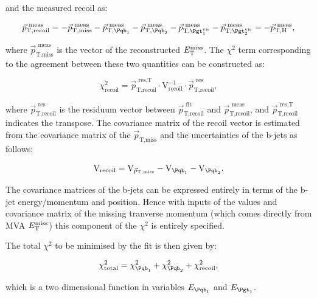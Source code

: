 and the measured recoil as:

\begin{equation}
\vec{p}_{\text{T},\text{recoil}}^{\text{~meas}} = -
\vec{p}_{\text{T},\text{miss}}^{\text{~meas}} -
\vec{p}_{\text{T},\Pqb_{1}}^{\text{~meas}} - \vec{p}_{\text{T},\Pqb_{2}}^{\text{~meas}} -
\vec{p}_{\text{T},\Pgt_{1}^{\text{vis}}}^{\text{~meas}} -
\vec{p}_{\text{T},\Pgt_{2}^{\text{vis}}}^{\text{~meas}} = -
\vec{p}_{\text{T},\text{H}}^{\text{~meas}} ,
\end{equation}

where $\vec{p}_{\text{T},\text{miss}}^{\text{~meas}}$ is the vector of the
reconstructed $E_{\mathrm{T}}^{\text{miss}}$. The $\chi^{2}$ term corresponding to the agreement between these two quantities
can be constructed as:

\begin{equation}
\chi_{\text{recoil}}^{2} = \vec{p}_{\text{T},\text{recoil}}^{\text{~res},\text{T}} \cdot
\text{V}_{\text{recoil}}^{-1} \cdot
\vec{p}_{\text{T},\text{recoil}}^{\text{~res}} ,  
\end{equation}

where $\vec{p}_{\text{T},\text{recoil}}^{\text{~res}}$ is the residuum vector between
$\vec{p}_{\text{T},\text{recoil}}^{\text{~fit}}$
and $\vec{p}_{\text{T},\text{recoil}}^{\text{~meas}}$, and
$\vec{p}_{\text{T},\text{recoil}}^{\text{~res},\text{T}}$ indicates the
transpose. The covariance matrix of the recoil vector is estimated from
the covariance matrix of the $\vec{p}_{\text{T},\text{miss}}$ and the uncertainties of the b-jets as
follows:

\begin{equation}
\text{V}_{\text{recoil}} = \text{V}_{\vec{p}_{\text{T},\text{miss}}} - \text{V}_{\Pqb_{1}} -
\text{V}_{\Pqb_{2}} .
\end{equation}

The covariance matrices of the b-jets can be expressed entirely in terms of the
b-jet energy/momentum and position. Hence with inputs of the values and
covariance matrix of the missing tranverse momentum (which comes directly from
MVA $E_{\mathrm{T}}^{\text{miss}}$) this component of the $\chi^{2}$ is entirely specified. 

The total $\chi^{2}$ to be minimised by the fit is then given by:

\begin{equation}
\chi_{\text{total}}^{2} = \chi_{\Pqb_{1}}^{2} + \chi_{\Pqb_{2}}^{2} + \chi_{\text{recoil}}^{2},
\end{equation}

which is a two dimensional function in variables $E_{\Pqb_{1}}$ and $E_{\Pgt_{1}}$.

